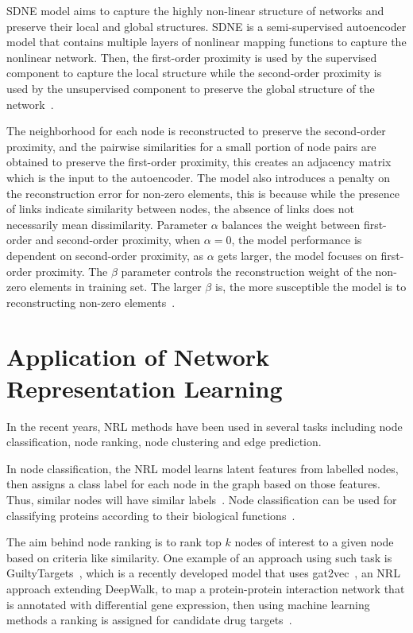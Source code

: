 \ac{SDNE} model aims to capture the highly non-linear structure of networks and preserve their local and global structures.
\ac{SDNE} is a semi-supervised autoencoder model that contains multiple layers of nonlinear mapping functions to capture the nonlinear network.
Then, the first-order proximity is used by the supervised component to capture the local structure while the second-order proximity is used by the unsupervised component to preserve the global structure of the network~\cite{wang_structural_2016}.

The neighborhood for each node is reconstructed to preserve the second-order proximity, and the pairwise similarities for a small portion of node pairs are obtained to preserve the first-order proximity, this creates an adjacency matrix which is the input to the autoencoder.
The model also introduces a penalty on the reconstruction error for non-zero elements, this is because while the presence of links indicate similarity between nodes, the absence of links does not necessarily mean dissimilarity.
Parameter $\alpha$ balances the weight between first-order and second-order proximity, when $\alpha=0$, the model performance is dependent on second-order proximity, as $\alpha$ gets larger, the model focuses on first-order proximity.
The $\beta$ parameter controls the reconstruction weight of the non-zero elements in training set.
The larger $\beta$ is, the more susceptible the model is to reconstructing non-zero elements~\cite{wang_structural_2016}.

\section{Application of Network Representation Learning}

In the recent years, \ac{NRL} methods have been used in several tasks including node classification, node ranking, node clustering and edge prediction.

In node classification, the \ac{NRL} model learns latent features from labelled nodes, then assigns a class label for each node in the graph based on those features.
Thus, similar nodes will have similar labels~\cite{cui_survey_2017}.
Node classification can be used for classifying proteins according to their biological functions~\cite{grover_node2vec:_2016}.

The aim behind node ranking is to rank top $k$ nodes of interest to a given node based on criteria like similarity.
One example of an approach using such task is GuiltyTargets~\cite{muslu_guiltytargets:_2019}, which is a recently developed model that uses gat2vec~\cite{sheikh_gat2vec:_2018}, an \ac{NRL} approach extending DeepWalk, to map a protein-protein interaction network that is annotated with differential gene expression, then using machine learning methods a ranking is assigned for candidate drug targets~\cite{muslu_guiltytargets:_2019}.

